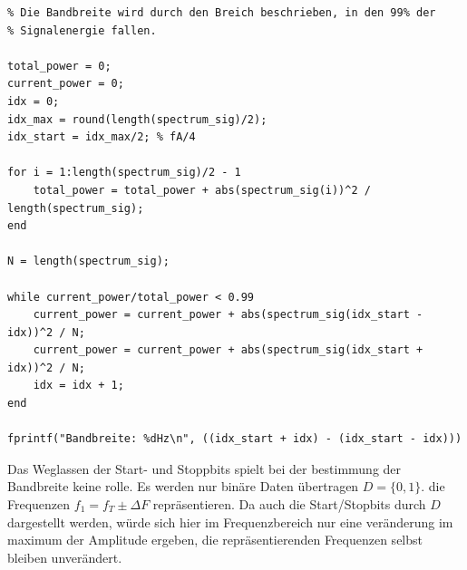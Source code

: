 \documentclass{article}
\begin{document}
\begin{verbatim}
% Die Bandbreite wird durch den Breich beschrieben, in den 99% der
% Signalenergie fallen.

total_power = 0;
current_power = 0;
idx = 0;
idx_max = round(length(spectrum_sig)/2);
idx_start = idx_max/2; % fA/4

for i = 1:length(spectrum_sig)/2 - 1
    total_power = total_power + abs(spectrum_sig(i))^2 / length(spectrum_sig);
end

N = length(spectrum_sig);

while current_power/total_power < 0.99
    current_power = current_power + abs(spectrum_sig(idx_start - idx))^2 / N;
    current_power = current_power + abs(spectrum_sig(idx_start + idx))^2 / N;
    idx = idx + 1;
end

fprintf("Bandbreite: %dHz\n", ((idx_start + idx) - (idx_start - idx)))
\end{verbatim}

Das Weglassen der Start- und Stoppbits spielt bei der bestimmung der Bandbreite keine rolle.
Es werden nur binäre Daten übertragen $D = \{0, 1\}$. die Frequenzen $ f_1 = f_T \pm \varDelta F $ repräsentieren. 
Da auch die Start/Stopbits durch $D$ dargestellt werden, würde sich hier im Frequenzbereich
nur eine veränderung im maximum der Amplitude ergeben, die repräsentierenden Frequenzen selbst bleiben unverändert.







\end{document}
